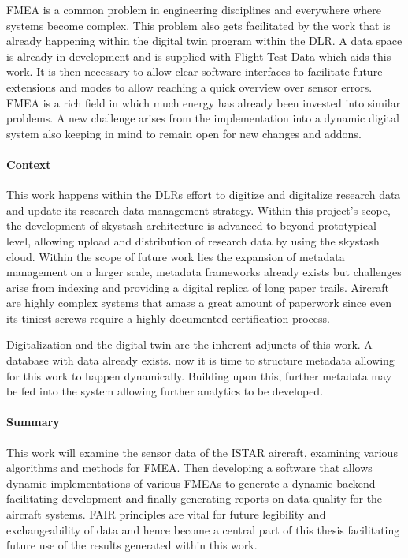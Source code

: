 FMEA is a common problem in engineering disciplines and everywhere where systems become complex. %
This problem also gets facilitated by the work that is already happening within the digital twin program within the DLR. A data space is already in development and is supplied with Flight Test Data which aids this work.
It is then necessary to allow clear software interfaces to facilitate future extensions and modes to allow reaching a quick overview over sensor errors.
FMEA is a rich field in which much energy has already been invested into similar problems. A new challenge arises from the implementation into a dynamic digital system also keeping in mind to remain open for new changes and addons.


\paragraph{Context}
This work happens within the DLRs effort to digitize and digitalize research data and update its research data management strategy.
Within this project's scope, the development of skystash architecture is advanced to beyond prototypical level, allowing upload and distribution of research data by using the skystash cloud.
Within the scope of future work lies the expansion of metadata management on a larger scale, metadata frameworks already exists but challenges arise from indexing and providing a digital replica of long paper trails. Aircraft are highly complex systems that amass a great amount of paperwork since even its tiniest screws require a highly documented certification process.

Digitalization and the digital twin are the inherent adjuncts of this work. A database with data already exists. now it is time to structure metadata allowing for this work to happen dynamically. Building upon this, further metadata may be fed into the system allowing further analytics to be developed.


\paragraph{Summary}

This work will examine the sensor data of the ISTAR aircraft, examining various algorithms and methods for FMEA. Then developing a software that allows dynamic implementations of various FMEAs to generate a dynamic backend facilitating development and finally generating reports on data quality for the aircraft systems. FAIR principles are vital for future legibility and exchangeability of data and hence become a central part of this thesis facilitating future use of the results generated within this work.